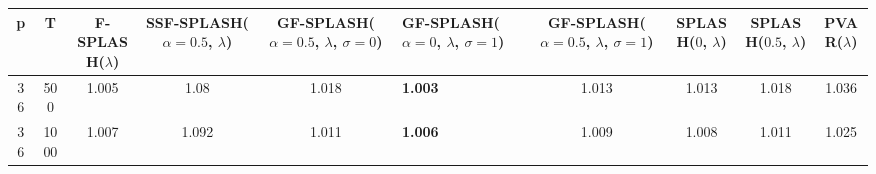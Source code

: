 \begin{tabular}{ccccclcccc}
\hline
  p  &  T   &  F-SPLASH($\lambda$)  &  SSF-SPLASH($\alpha=0.5$, $\lambda$)  &  GF-SPLASH($\alpha=0.5$, $\lambda$, $\sigma=0$)  & GF-SPLASH($\alpha=0$, $\lambda$, $\sigma=1$)   &  GF-SPLASH($\alpha=0.5$, $\lambda$, $\sigma=1$)  &  SPLASH($0$, $\lambda$)  &  SPLASH($0.5$, $\lambda$)  &  PVAR($\lambda$)  \\
\hline
 36  & 500  &         1.005         &                 1.08                  &                      1.018                       & \textbf{1.003}                                 &                      1.013                       &          1.013           &           1.018            &       1.036       \\
 36  & 1000 &         1.007         &                 1.092                 &                      1.011                       & \textbf{1.006}                                 &                      1.009                       &          1.008           &           1.011            &       1.025       \\
\hline
\end{tabular}